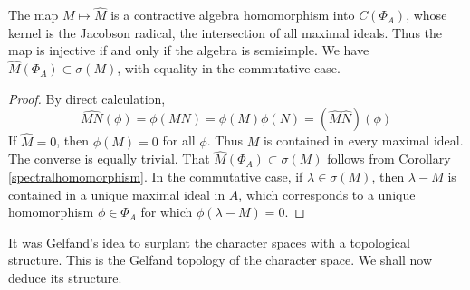 \begin{lemma}
    The map $M \mapsto \widehat{M}$ is a contractive algebra homomorphism into $C(\Phi_A)$, whose kernel is the Jacobson radical, the intersection of all maximal ideals. Thus the map is injective if and only if the algebra is semisimple. We have $\widehat{M}(\Phi_A) \subset \sigma(M)$, with equality in the commutative case.
\end{lemma}
\begin{proof}
    By direct calculation,
    \[ \widehat{MN}(\phi) = \phi(MN) = \phi(M) \phi(N) = (\widehat{M} \widehat{N})(\phi) \]
    If $\widehat{M} = 0$, then $\phi(M) = 0$ for all $\phi$. Thus $M$ is contained in every maximal ideal. The converse is equally trivial. That $\widehat{M}(\Phi_A) \subset \sigma(M)$ follows from Corollary \ref{spectralhomomorphism}. In the commutative case, if $\lambda \in \sigma(M)$, then $\lambda - M$ is contained in a unique maximal ideal in $A$, which corresponds to a unique homomorphism $\phi \in \Phi_A$ for which $\phi(\lambda - M) = 0$.
\end{proof}

It was Gelfand's idea to surplant the character spaces with a topological structure. This is the Gelfand topology of the character space. We shall now deduce its structure.

